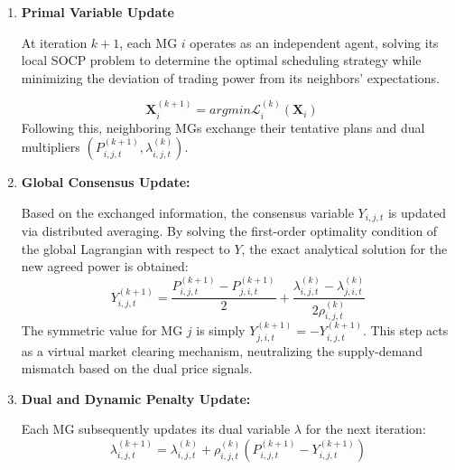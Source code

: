 \documentclass[preprint,12pt]{elsarticle}
\begin{document}
\begin{enumerate}
    \item \textbf{Primal Variable Update}
    
    At iteration $k+1$, each MG $i$ operates as an independent agent, solving its local SOCP problem to determine the optimal scheduling strategy while minimizing the deviation of trading power from its neighbors' expectations.

    \begin{equation}
        \mathbf{X}_i^{(k+1)} = argmin \mathcal{L}_i^{(k)}(\mathbf{X}_i) \quad 
    \end{equation}
    Following this, neighboring MGs exchange their tentative plans and dual multipliers $(P_{i,j,t}^{(k+1)}, \lambda_{i,j,t}^{(k)})$.

    \item \textbf{Global Consensus Update:}
    
    Based on the exchanged information, the consensus variable $Y_{i,j,t}$ is updated via distributed averaging. By solving the first-order optimality condition of the global Lagrangian with respect to $Y$, the exact analytical solution for the new agreed power is obtained:
    \begin{equation}
    Y_{i,j,t}^{(k+1)} = \frac{P_{i,j,t}^{(k+1)} - P_{j,i,t}^{(k+1)}}{2} + \frac{\lambda_{i,j,t}^{(k)} - \lambda_{j,i,t}^{(k)}}{2\rho_{i,j,t}^{(k)}} \label{eq_15}
    \end{equation}
    The symmetric value for MG $j$ is simply $Y_{j,i,t}^{(k+1)} = -Y_{i,j,t}^{(k+1)}$. This step acts as a virtual market clearing mechanism, neutralizing the supply-demand mismatch based on the dual price signals.

    \item \textbf{Dual and Dynamic Penalty Update:}
    
    Each MG subsequently updates its dual variable $\lambda$ for the next iteration:
    \begin{equation}
    \lambda_{i,j,t}^{(k+1)} = \lambda_{i,j,t}^{(k)} + \rho_{i,j,t}^{(k)} \left( P_{i,j,t}^{(k+1)} - Y_{i,j,t}^{(k+1)} \right) 
    \label{eq:price_lambda}
    \end{equation}
    

\end{enumerate}
\end{document}
